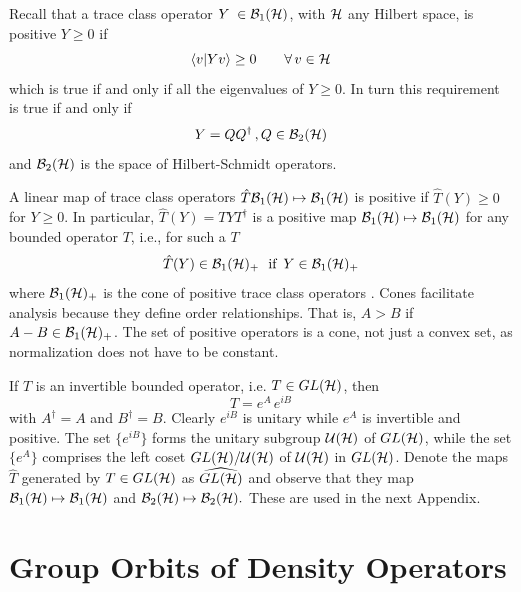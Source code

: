 \noindent Recall that a trace class operator $Y \; \in {\cal B}_{1} ( {\cal H%
})$, with ${\cal H}$ any Hilbert space, is positive $Y \ge 0$ if 
\begin{equation}
\langle v | Y v \rangle \ge 0 \qquad \forall \, v \in {\cal H}
\end{equation}
which is true if and only if all the eigenvalues of $Y \ge 0$. In turn this
requirement is true if and only if 
\begin{equation}
Y = Q Q^{\dagger} \, , Q\in {\cal B}_{2} ( {\cal H})
\end{equation}
and ${\cal B}_{2} ( {\cal H})$ is the space of Hilbert-Schmidt operators.

A linear map of trace class operators $\hat{T}{\cal B}_{1}({\cal H})\mapsto 
{\cal B}_{1}({\cal H})$ is positive if $\hat{T}(Y)\geq 0$ for $Y\geq 0$. In
particular, $\hat{T}(Y)=TYT^{\dagger }$ is a positive map ${\cal B}_{1}(%
{\cal H})\mapsto {\cal B}_{1}({\cal H})$ for any bounded operator $T$, i.e.,
for such a $T$ 
\begin{equation}
\hat{T}(Y)\in {\cal B}_{1}({\cal H})_{+}\,\,\text{{\ if }}\,Y\in {\cal B}%
_{1}({\cal H})_{+}
\end{equation}%
where ${\cal B}_{1}({\cal H})_{+}$ is the cone of positive trace class
operators \cite{Kummer}. Cones facilitate analysis because they define order
relationships. That is, $A>B$ if $A-B\in {\cal B}_{1}({\cal H})_{+}$. The
set of positive operators is a cone, not just a convex set, as normalization
does not have to be constant.

If $T$ is an invertible bounded operator, i.e. $T\in GL({\cal H})$, then 
\begin{equation}
T=e^{A}\,e^{iB}
\end{equation}%
with $A^{\dagger }=A$ and $B^{\dagger }=B$. Clearly $e^{iB}$ is unitary
while $e^{A}$ is invertible and positive. The set $\{e^{iB}\}$ forms the
unitary subgroup ${\cal U}({\cal H})$ of $GL({\cal H})$, while the set $\{
e^{A}\}$ comprises the left coset $GL({\cal H})/{\cal U}({\cal H})$ of $%
{\cal U}({\cal H})$ in $GL({\cal H})$. Denote the maps $\hat{T}$ generated
by $T\in GL({\cal H})$ as $\widehat{GL({\cal H})}$ and observe that they map 
${\cal B}_{1}({\cal H})\mapsto {\cal B}_{1}({\cal H})$ and ${\cal B}_{2}(%
{\cal H})\mapsto {\cal B}_{2}({\cal H}).$ These are used in the next
Appendix.

\section{Group Orbits of Density Operators}


